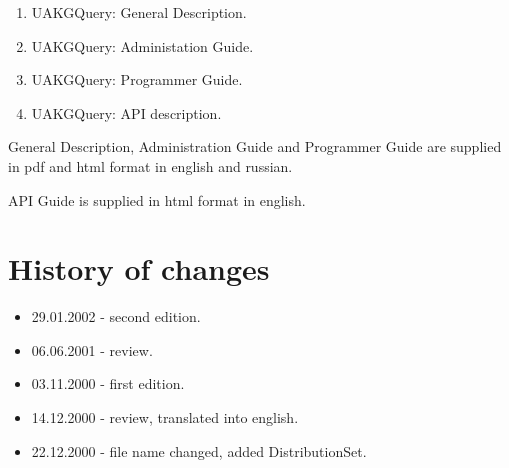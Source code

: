 \documentclass[12pt]{article}
\begin{document}
 \begin{enumerate}
   \item UAKGQuery: General Description. 
   \item UAKGQuery: Administation Guide.
   \item UAKGQuery: Programmer Guide.
   \item UAKGQuery: API description.
 \end{enumerate}

 General Description, Administration Guide and Programmer Guide are supplied
in pdf and html format in english and russian.

 API Guide is supplied in html format in english.

\section{ History of changes }

 \begin{itemize}
   \item 29.01.2002 - second edition.
   \item 06.06.2001 - review.
   \item 03.11.2000 - first edition.
   \item 14.12.2000 - review, translated into english.
   \item 22.12.2000 - file name changed, added DistributionSet.
 \end{itemize}
\end{document}
